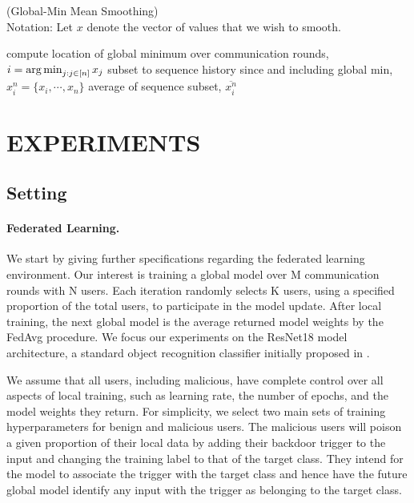 \documentclass{article} %
\begin{document}
\begin{algorithm}[H]
\caption{ (Global-Min Mean Smoothing) \\ 
Notation: Let $x$ denote the vector of values that we wish to smooth.
}
\label{alg:smoothing}
\begin{algorithmic}[1]

        \State compute location of global minimum over communication rounds, $i = \operatorname*{arg\,min}_{j: j \in \mathopen[ n \mathclose]} x_j$
        \State subset to sequence history since and including global min, $x_i^n = \{x_i, \cdots, x_n \}$
        \State \Return average of sequence subset, $\overline{x_i^n}$
    \EndProcedure
\end{algorithmic}
\end{algorithm}


\section{EXPERIMENTS}

%
\subsection{Setting}

\paragraph{Federated Learning.} We start by giving further specifications regarding the federated learning environment. Our interest is training a global model over M communication rounds with N users. Each iteration randomly selects K users, using a specified proportion of the total users, to participate in the model update. After local training, the next global model is the average returned model weights by the FedAvg procedure. We focus  our experiments on the ResNet18 model architecture, a standard object recognition classifier initially proposed in \cite{resnet}. 

We assume that all users, including malicious, have complete control over all aspects of local training, such as learning rate, the number of epochs, and the model weights they return. For simplicity, we select two main sets of training hyperparameters for benign and malicious users. The malicious users will poison a given proportion of their local data by adding their backdoor trigger to the input and changing the training label to that of the target class. They intend for the model to associate the trigger with the target class and hence have the future global model identify any input with the trigger as belonging to the target class. 
\end{document}
